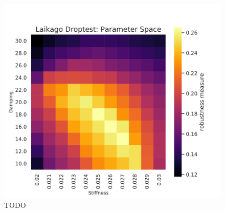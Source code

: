 \begin{figure}[h]
\begin{minipage}{0.33\textwidth}
        \end{minipage}
        \begin{minipage}{0.33\textwidth}
            \centering
            \includegraphics[width=\textwidth]{figures/droptest_ps_zoom2_v2.png} %
        \end{minipage}

    \caption{TODO}
    \end{figure}



